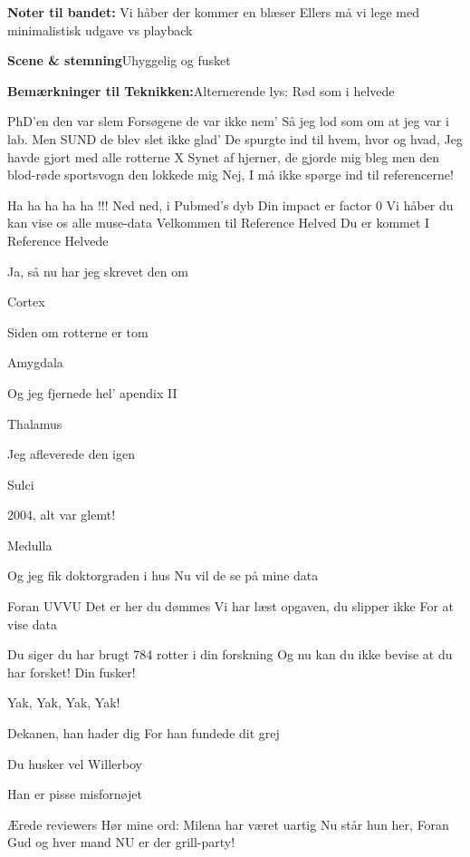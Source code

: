 \documentclass[a4paper,11pt]{article}
\begin{document}
\begin{song}
\scene \textbf{Noter til bandet:}
Vi håber der kommer en blæser
Ellers må vi lege med minimalistisk udgave vs playback

\scene \textbf{Scene \& stemning}Uhyggelig og fusket

\scene \textbf{Bemærkninger til Teknikken:}Alternerende lys: Rød som i helvede

  
PhD’en den var slem
Forsøgene de var ikke nem’
Så jeg lod som om at jeg var i lab. 
Men SUND de blev slet ikke glad’
De spurgte ind til hvem, hvor og hvad, Jeg havde gjort med alle rotterne  X
Synet af hjerner, de gjorde
mig bleg
men den blod-røde sportsvogn den lokkede mig
Nej, I må ikke spørge ind til referencerne!
 
Ha ha ha ha ha !!!
 Ned ned, i Pubmed’s dyb
Din impact er factor 0
Vi håber du kan vise os
alle muse-data
Velkommen til
Reference Helved
Du er kommet
I Reference Helvede
 
Ja, så nu har jeg skrevet den om
 
 Cortex
 
 Siden om rotterne er tom
 
 Amygdala
 
 Og jeg fjernede hel’ apendix II
 
 Thalamus
 
 Jeg afleverede den igen
 
Sulci
 
 2004, alt var glemt!
 
Medulla
 
Og jeg fik doktorgraden i
hus
Nu vil de se på mine data
 
Foran UVVU
Det er her du dømmes
Vi har læst opgaven, du
slipper ikke
For at vise data
 

Du siger du har brugt 784 rotter i din forskning
Og nu kan du ikke bevise at du har
forsket! Din fusker!
 
Yak, Yak, Yak, Yak!
 
Dekanen, han hader dig
For han fundede dit grej
 
Du husker vel Willerboy
 
Han er pisse misfornøjet
 
Ærede reviewers
Hør mine ord:
Milena har været uartig
Nu står hun her,
Foran Gud og hver mand
NU er der grill-party!
 

\end{song}
\end{document}
